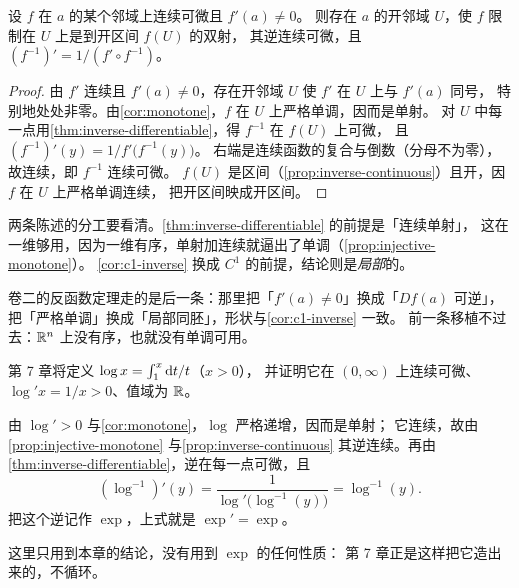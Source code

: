 \begin{corollary}[\(C^{1}\) 版]
  \label{cor:c1-inverse}
  设 \(f\) 在 \(a\) 的某个邻域上连续可微且 \(f'(a) \neq 0\)。
  则存在 \(a\) 的开邻域 \(U\)，使 \(f\) 限制在 \(U\) 上是到开区间 \(f(U)\) 的双射，
  其逆连续可微，且 \((f^{-1})' = 1/(f' \circ f^{-1})\)。
\end{corollary}

\begin{proof}
  由 \(f'\) 连续且 \(f'(a) \neq 0\)，存在开邻域 \(U\) 使 \(f'\) 在 \(U\) 上与 \(f'(a)\) 同号，
  特别地处处非零。由\cref{cor:monotone}，\(f\) 在 \(U\) 上严格单调，因而是单射。
  对 \(U\) 中每一点用\cref{thm:inverse-differentiable}，得 \(f^{-1}\) 在 \(f(U)\) 上可微，
  且 \((f^{-1})'(y) = 1/f'\bigl(f^{-1}(y)\bigr)\)。
  右端是连续函数的复合与倒数（分母不为零），故连续，即 \(f^{-1}\) 连续可微。
  \(f(U)\) 是区间（\cref{prop:inverse-continuous}）且开，因 \(f\) 在 \(U\) 上严格单调连续，
  把开区间映成开区间。
\end{proof}

\begin{remark}
  两条陈述的分工要看清。\cref{thm:inverse-differentiable} 的前提是「连续单射」，
  这在一维够用，因为一维有序，单射加连续就逼出了单调（\cref{prop:injective-monotone}）。
  \cref{cor:c1-inverse} 换成 \(C^{1}\) 的前提，结论则是\emph{局部}的。

  卷二的反函数定理走的是后一条：那里把「\(f'(a) \neq 0\)」换成「\(Df(a)\) 可逆」，
  把「严格单调」换成「局部同胚」，形状与\cref{cor:c1-inverse} 一致。
  前一条移植不过去：\(\mathbb{R}^{n}\) 上没有序，也就没有单调可用。
\end{remark}

\begin{example}[第 7 章要用的正是这一条]
  \label{ex:inverse-preview}
  第 7 章将定义 \(\log x = \int_{1}^{x} \mathop{}\!\mathrm{d} t/t\)（\(x>0\)），
  并证明它在 \((0,\infty)\) 上连续可微、\(\log' x = 1/x > 0\)、值域为 \(\mathbb{R}\)。
  \begin{worked}
    由 \(\log' > 0\) 与\cref{cor:monotone}，\(\log\) 严格递增，因而是单射；
    它连续，故由\cref{prop:injective-monotone} 与\cref{prop:inverse-continuous}
    其逆连续。再由\cref{thm:inverse-differentiable}，逆在每一点可微，且
    \[
      (\log^{-1})'(y) = \frac{1}{\log'\bigl(\log^{-1}(y)\bigr)} = \log^{-1}(y) .
    \]
    把这个逆记作 \(\exp\)，上式就是 \(\exp' = \exp\)。

    这里只用到本章的结论，没有用到 \(\exp\) 的任何性质：
    第 7 章正是这样把它造出来的，不循环。
  \end{worked}
\end{example}

